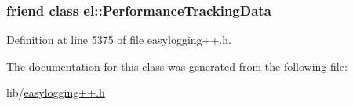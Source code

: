 \hypertarget{classel_1_1base_1_1_performance_tracker_a7a4da7334b79856c37538484584207a6}{}
\subsubsection[{el\+::\+Performance\+Tracking\+Data}]{\setlength{\rightskip}{0pt plus 5cm}friend class {\bf el\+::\+Performance\+Tracking\+Data}\hspace{0.3cm}{\ttfamily [friend]}}\label{classel_1_1base_1_1_performance_tracker_a7a4da7334b79856c37538484584207a6}


Definition at line 5375 of file easylogging++.\+h.



The documentation for this class was generated from the following file\+:\begin{DoxyCompactItemize}
\item 
lib/\hyperlink{easylogging_09_09_8h}{easylogging++.\+h}\end{DoxyCompactItemize}
